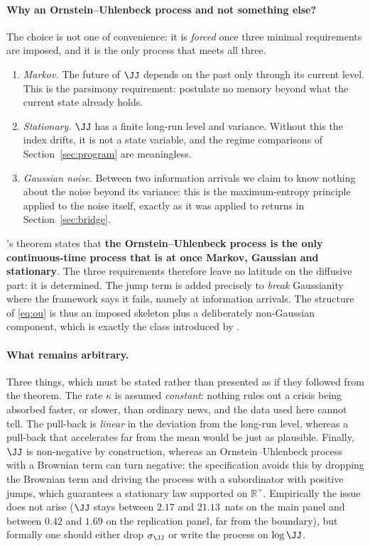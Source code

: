 \paragraph{Why an Ornstein--Uhlenbeck process and not something else?} The choice
is not one of convenience: it is \emph{forced} once three minimal requirements
are imposed, and it is the only process that meets all three.

\begin{enumerate}
\item \emph{Markov.} The future of $\JJ$ depends on the past only through its
current level. This is the parsimony requirement: postulate no memory beyond
what the current state already holds.
\item \emph{Stationary.} $\JJ$ has a finite long-run level and variance. Without
this the index drifts, it is not a state variable, and the regime comparisons of
Section~\ref{sec:program} are meaningless.
\item \emph{Gaussian noise.} Between two information arrivals we claim to know
nothing about the noise beyond its variance: this is the maximum-entropy
principle applied to the noise itself, exactly as it was applied to returns in
Section~\ref{sec:bridge}.
\end{enumerate}

\citet{doob1942}'s theorem states that \textbf{the Ornstein--Uhlenbeck process is
the only continuous-time process that is at once Markov, Gaussian and
stationary}. The three requirements therefore leave no latitude on the diffusive
part: it is determined. The jump term is added precisely to \emph{break}
Gaussianity where the framework says it fails, namely at information arrivals.
The structure of \eqref{eq:ou} is thus an imposed skeleton plus a deliberately
non-Gaussian component, which is exactly the class introduced by
\citet{bns2001}.

\paragraph{What remains arbitrary.} Three things, which must be stated rather
than presented as if they followed from the theorem. The rate $\kappa$ is
assumed \emph{constant}: nothing rules out a crisis being absorbed faster, or
slower, than ordinary news, and the data used here cannot tell. The pull-back is
\emph{linear} in the deviation from the long-run level, whereas a pull-back that
accelerates far from the mean would be just as plausible. Finally, $\JJ$ is
non-negative by construction, whereas an Ornstein--Uhlenbeck process with a
Brownian term can turn negative: the \citet{bns2001} specification avoids this
by dropping the Brownian term and driving the process with a subordinator with
positive jumps, which guarantees a stationary law supported on $\mathbb{R}^+$.
Empirically the issue does not arise ($\JJ$ stays between $2.17$ and
$21.13$~nats on the main panel and between $0.42$ and $1.69$ on the replication
panel, far from the boundary), but formally one should either drop
$\sigma_\JJ$ or write the process on $\log\JJ$.

